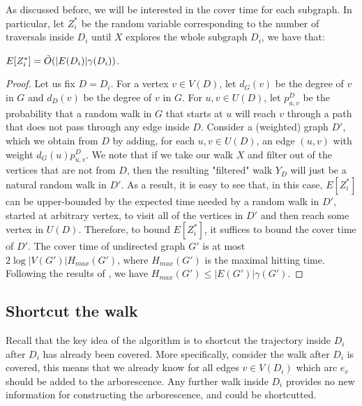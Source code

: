 As discussed before, we will be interested in the cover time for each subgraph. In particular, let $Z^*_i$ be the random variable corresponding to the number of traversals inside $D_i$ until $X$ explores the whole subgraph $D_i$, we have that:
\begin{lemma}
    \label{lem:cover}
    $E[Z_i^*] = \tilde{O}(|E(D_i)|\gamma(D_i))$.
\end{lemma}
\begin{proof}
Let us fix $D = D_i$. For a vertex $v \in V(D)$, let $d_G(v)$ be the degree of $v$ in $G$ and $d_D(v)$ be the degree of $v$ in $G$. For $u,v \in U(D)$, let $p_{u,v}^D$ be the probability that a random walk in $G$ that starts at $u$ will reach $v$ through a path that does not pass through any edge inside $D$. Consider a (weighted) graph $D'$, which we obtain from $D$ by adding, for each $u,v \in U(D)$, an edge $(u, v)$ with weight $d_G(u) p_{u,v}^D$. We note that if we take our walk $X$ and filter out of the vertices that are not from $D$, then the resulting "filtered" walk $Y_D$ will just be a natural random walk in $D'$. As a result, it is easy to see that, in this case, $E[Z_i^*]$ can be upper-bounded by the expected time needed by a random walk in $D'$, started at arbitrary vertex, to visit all of the vertices in $D'$ and then reach some vertex in $U(D)$. Therefore, to bound $E[Z_i^*]$, it suffices to bound the cover time of $D'$. The cover time of undirected graph $G'$ is at most $2\log|V(G')|H_{max}(G')$, where $H_{max}(G')$ is the maximal hitting time. Following the results of \cite{aleliunas1979random}, we have $H_{max}(G') \leq |E(G')|\gamma(G')$. 
\end{proof}

\subsection{Shortcut the walk}
Recall that the key idea of the algorithm is to shortcut the trajectory inside $D_i$ after $D_i$ has already been covered. 
More specifically, consider the walk after $D_i$ is covered, this means that we already know for all edges $v \in V(D_i)$ which arc $e_v$ should be added to the arborescence. 
Any further walk inside $D_i$ provides no new information for constructing the arborescence, and could be shortcutted.

